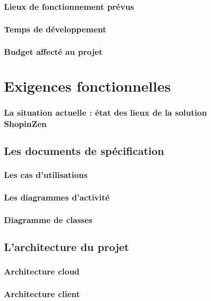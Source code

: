 \documentclass[12pt]{article}
\begin{document}
\subsubsection{Lieux de fonctionnement prévus}
\subsubsection{Temps de développement}
\subsubsection{Budget affecté au projet}


\newpage
\section{Exigences fonctionnelles}
\subsubsection{La situation actuelle : état des lieux de la solution ShopinZen}

\subsection{Les documents de spécification}
\subsubsection{Les cas d'utilisations}

\subsubsection{Les diagrammes d'activité}

\subsubsection{Diagramme de classes}
\subsection{L'architecture du projet}
\subsubsection{Architecture cloud}
\subsubsection{Architecture client}
\end{document}
